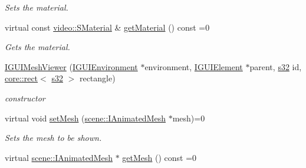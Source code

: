 \begin{DoxyCompactItemize}
\begin{DoxyCompactList}\small\item\em Sets the material. \end{DoxyCompactList}\item 
\mbox{\label{classirr_1_1gui_1_1IGUIMeshViewer_a22fefc9c5255e1896c16e72edb7cd373}} 
virtual const \hyperlink{classirr_1_1video_1_1SMaterial}{video\+::\+S\+Material} \& \hyperlink{classirr_1_1gui_1_1IGUIMeshViewer_a22fefc9c5255e1896c16e72edb7cd373}{get\+Material} () const =0
\begin{DoxyCompactList}\small\item\em Gets the material. \end{DoxyCompactList}\item 
\mbox{\label{classirr_1_1gui_1_1IGUIMeshViewer_a36025535144bcd7fc8906071738db130}} 
\hyperlink{classirr_1_1gui_1_1IGUIMeshViewer_a36025535144bcd7fc8906071738db130}{I\+G\+U\+I\+Mesh\+Viewer} (\hyperlink{classirr_1_1gui_1_1IGUIEnvironment}{I\+G\+U\+I\+Environment} $\ast$environment, \hyperlink{classirr_1_1gui_1_1IGUIElement}{I\+G\+U\+I\+Element} $\ast$parent, \hyperlink{namespaceirr_ac66849b7a6ed16e30ebede579f9b47c6}{s32} id, \hyperlink{classirr_1_1core_1_1rect}{core\+::rect}$<$ \hyperlink{namespaceirr_ac66849b7a6ed16e30ebede579f9b47c6}{s32} $>$ rectangle)
\begin{DoxyCompactList}\small\item\em constructor \end{DoxyCompactList}\item 
\mbox{\label{classirr_1_1gui_1_1IGUIMeshViewer_a1af18c83f050af42cdd9f76df28659ec}} 
virtual void \hyperlink{classirr_1_1gui_1_1IGUIMeshViewer_a1af18c83f050af42cdd9f76df28659ec}{set\+Mesh} (\hyperlink{classirr_1_1scene_1_1IAnimatedMesh}{scene\+::\+I\+Animated\+Mesh} $\ast$mesh)=0
\begin{DoxyCompactList}\small\item\em Sets the mesh to be shown. \end{DoxyCompactList}\item 
\mbox{\label{classirr_1_1gui_1_1IGUIMeshViewer_a2e61772e79bec9c9580016151b98f37b}} 
virtual \hyperlink{classirr_1_1scene_1_1IAnimatedMesh}{scene\+::\+I\+Animated\+Mesh} $\ast$ \hyperlink{classirr_1_1gui_1_1IGUIMeshViewer_a2e61772e79bec9c9580016151b98f37b}{get\+Mesh} () const =0

\end{DoxyCompactItemize}
